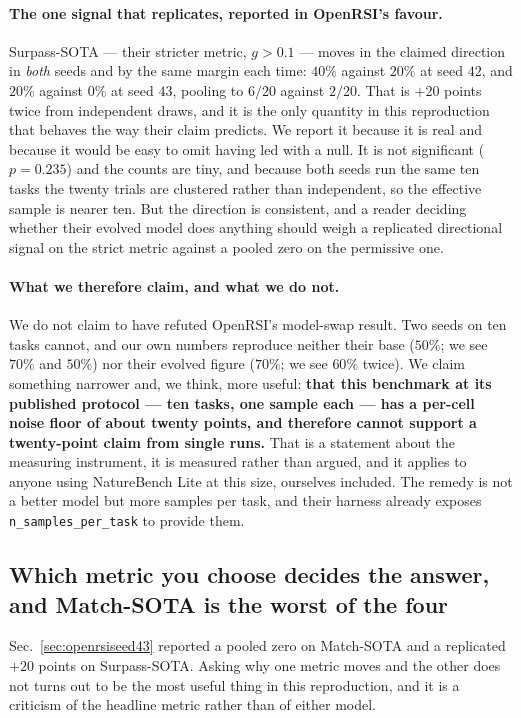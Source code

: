 \paragraph{The one signal that replicates, reported in OpenRSI's favour.}
Surpass-SOTA --- their stricter metric, $g > 0.1$ --- moves in the claimed direction in
\emph{both} seeds and by the same margin each time: $40\%$ against $20\%$ at seed $42$, and
$20\%$ against $0\%$ at seed $43$, pooling to $6/20$ against $2/20$. That is $+20$ points twice
from independent draws, and it is the only quantity in this reproduction that behaves the way
their claim predicts. We report it because it is real and because it would be easy to omit
having led with a null. It is not significant ($p = 0.235$) and the counts are tiny, and
because both seeds run the same ten tasks the twenty trials are clustered rather than
independent, so the effective sample is nearer ten. But the direction is consistent, and a
reader deciding whether their evolved model does anything should weigh a replicated
directional signal on the strict metric against a pooled zero on the permissive one.

\paragraph{What we therefore claim, and what we do not.}
We do not claim to have refuted OpenRSI's model-swap result. Two seeds on ten tasks cannot,
and our own numbers reproduce neither their base ($50\%$; we see $70\%$ and $50\%$) nor their
evolved figure ($70\%$; we see $60\%$ twice). We claim something narrower and, we think, more
useful: \textbf{that this benchmark at its published protocol --- ten tasks, one sample each
--- has a per-cell noise floor of about twenty points, and therefore cannot support a
twenty-point claim from single runs.} That is a statement about the measuring instrument, it is
measured rather than argued, and it applies to anyone using NatureBench Lite at this size,
ourselves included. The remedy is not a better model but more samples per task, and their
harness already exposes \texttt{n\_samples\_per\_task} to provide them.

\subsection{Which metric you choose decides the answer, and Match-SOTA is the worst of the
four}
\label{sec:openrsimetric}

Sec.~\ref{sec:openrsiseed43} reported a pooled zero on Match-SOTA and a replicated $+20$ points
on Surpass-SOTA. Asking why one metric moves and the other does not turns out to be the most
useful thing in this reproduction, and it is a criticism of the headline metric rather than of
either model.

